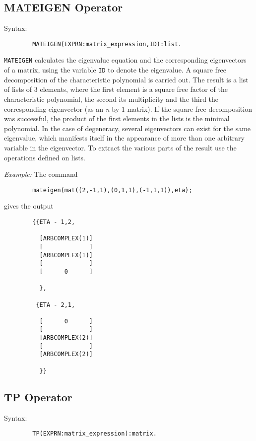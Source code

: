 \subsection{MATEIGEN Operator}
Syntax:
\begin{verbatim}
        MATEIGEN(EXPRN:matrix_expression,ID):list.
\end{verbatim}

{\tt MATEIGEN} calculates the eigenvalue equation and the corresponding
eigenvectors of a matrix, using the variable {\tt ID} to denote the
eigenvalue.  A square free decomposition of the characteristic polynomial
is carried out.  The result is a list of lists of 3 elements, where the
first element is a square free factor of the characteristic polynomial,
the second its multiplicity and the third the corresponding eigenvector
(as an {\em n} by 1 matrix).  If the square free decomposition was
successful, the product of the first elements in the lists is the minimal
polynomial.  In the case of degeneracy, several eigenvectors can exist for
the same eigenvalue, which manifests itself in the appearance of more than
one arbitrary variable in the eigenvector.  To extract the various parts
of the result use the operations defined on lists.

{\it Example:}
 The command
\begin{verbatim}
        mateigen(mat((2,-1,1),(0,1,1),(-1,1,1)),eta);
\end{verbatim}
gives the output
\begin{verbatim}
        {{ETA - 1,2,

          [ARBCOMPLEX(1)]
          [             ]
          [ARBCOMPLEX(1)]
          [             ]
          [      0      ]

          },

         {ETA - 2,1,

          [      0      ]
          [             ]
          [ARBCOMPLEX(2)]
          [             ]
          [ARBCOMPLEX(2)]

          }}
\end{verbatim}

\subsection{TP Operator}
Syntax:
\begin{verbatim}
        TP(EXPRN:matrix_expression):matrix.
\end{verbatim}

